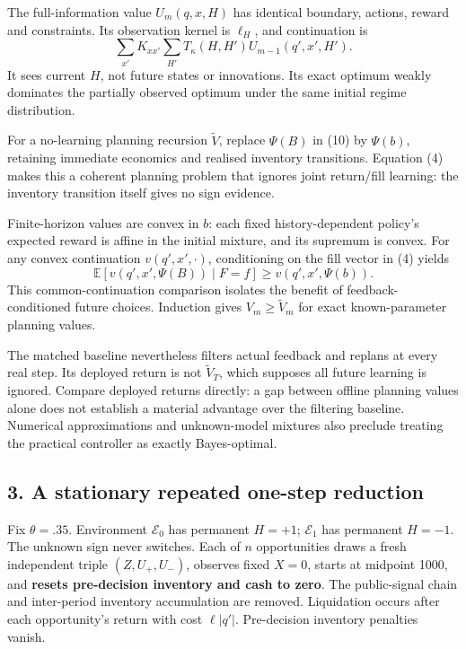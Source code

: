 \documentclass[
  10pt,
  a4paper,
]{article}
\begin{document}
The full-information value \(U_m(q,x,H)\) has identical boundary,
actions, reward and constraints. Its observation kernel is \(\ell_H\),
and continuation is \[
\sum_{x'}K_{xx'}\sum_{H'}T_\kappa(H,H')U_{m-1}(q',x',H').
\tag{13}
\] It sees current \(H\), not future states or innovations. Its exact
optimum weakly dominates the partially observed optimum under the same
initial regime distribution.

For a no-learning planning recursion \(\widetilde V\), replace
\(\Psi(B)\) in (10) by \(\Psi(b)\), retaining immediate economics and
realised inventory transitions. Equation (4) makes this a coherent
planning problem that ignores joint return/fill learning: the inventory
transition itself gives no sign evidence.

Finite-horizon values are convex in \(b\): each fixed history-dependent
policy's expected reward is affine in the initial mixture, and its
supremum is convex. For any convex continuation \(v(q',x',\cdot)\),
conditioning on the fill vector in (4) yields \[
\mathbb E[v(q',x',\Psi(B))\mid F=f]
\ge v(q',x',\Psi(b)).
\tag{14}
\] This common-continuation comparison isolates the benefit of
feedback-conditioned future choices. Induction gives
\(V_m\ge\widetilde V_m\) for exact known-parameter planning values.

The matched baseline nevertheless filters actual feedback and replans at
every real step. Its deployed return is not \(\widetilde V_T\), which
supposes all future learning is ignored. Compare deployed returns
directly: a gap between offline planning values alone does not establish
a material advantage over the filtering baseline. Numerical
approximations and unknown-model mixtures also preclude treating the
practical controller as exactly Bayes-optimal.

\subsection{3. A stationary repeated one-step
reduction}\label{a-stationary-repeated-one-step-reduction}

Fix \(\theta=.35\). Environment \(\mathcal E_0\) has permanent \(H=+1\);
\(\mathcal E_1\) has permanent \(H=-1\). The unknown sign never
switches. Each of \(n\) opportunities draws a fresh independent triple
\((Z,U_+,U_-)\), observes fixed \(X=0\), starts at midpoint 1000, and
\textbf{resets pre-decision inventory and cash to zero}. The
public-signal chain and inter-period inventory accumulation are removed.
Liquidation occurs after each opportunity's return with cost
\(\ell|q'|\). Pre-decision inventory penalties vanish.
\end{document}
